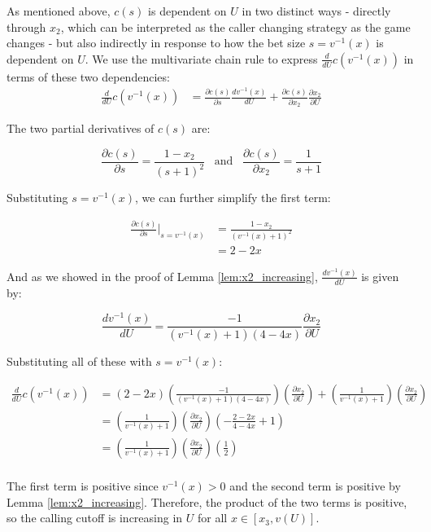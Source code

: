 \documentclass[../../main/main.tex]{subfiles}
\begin{document}
\begin{customproof}
    As mentioned above, $c(s)$ is dependent on $U$ in two distinct ways -  directly through $x_2$, which can be interpreted as the caller changing strategy as the game changes - but also indirectly in response to how the bet size $s = v^{-1}(x)$ is dependent on $U$. We use the multivariate chain rule to express $\frac{d}{dU} c(v^{-1}(x))$ in terms of these two dependencies:
    \begin{align*}
        \frac{d}{dU} c(v^{-1}(x)) & = \frac{\partial c(s)}{\partial s} \frac{d v^{-1}(x)}{d U} + \frac{\partial c(s)}{\partial x_2} \frac{\partial x_2}{\partial U}
    \end{align*}
    
    The two partial derivatives of $c(s)$ are:

    $$ \frac{\partial c(s)}{\partial s} = \frac{1-x_2}{(s+1)^2} \; \; \; \text{and} \; \; \; \frac{\partial c(s)}{\partial x_2} = \frac{1}{s+1} $$

    Substituting $s = v^{-1}(x)$, we can further simplify the first term:

    \begin{align*}
        \frac{\partial c(s)}{\partial s} \bigg|_{s=v^{-1}(x)} & = \frac{1-x_2}{(v^{-1}(x)+1)^2} \\
        & = 2-2x
    \end{align*}

    And as we showed in the proof of Lemma \ref{lem:x2_increasing}, $\frac{d v^{-1}(x)}{d U}$ is given by:

    $$ \frac{d v^{-1}(x)}{d U} = \frac{-1}{(v^{-1}(x)+1)(4-4x)} \frac{\partial x_2}{\partial U} $$

    Substituting all of these with $s = v^{-1}(x)$:

    \begin{align*}
        \frac{d}{dU} c(v^{-1}(x)) & = 
        \left(2-2x\right) 
        \left(\frac{-1}{(v^{-1}(x)+1)(4-4x)}\right) 
        \left(\frac{\partial x_2}{\partial U}\right) 
        + \left(\frac{1}{v^{-1}(x)+1}\right) 
        \left(\frac{\partial x_2}{\partial U}\right)\\
        & = \left( \frac{1}{v^{-1}(x)+1} \right) 
        \left( \frac{\partial x_2}{\partial U} \right)
        \left( -\frac{2-2x}{4-4x} + 1\right) \\
        & = \left( \frac{1}{v^{-1}(x)+1} \right) 
        \left( \frac{\partial x_2}{\partial U} \right)
        \left( \frac{1}{2} \right) \\
    \end{align*}

    The first term is positive since $v^{-1}(x) > 0$ and the second term is positive by Lemma \ref{lem:x2_increasing}. Therefore, the product of the two terms is positive, so the calling cutoff is increasing in $U$ for all $x \in [x_3, v(U)]$.

\end{customproof}
\end{document}
